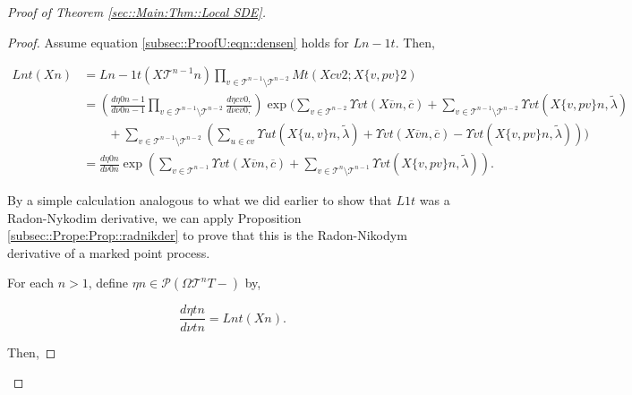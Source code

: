 \documentclass[12pt]{article}
\newcommand{\mc}{\mathcal}
\newcommand{\ov}{\overline}
\newcommand{\ind}{\hspace{24pt}}
\newcommand{\pmsr}{\mc{P}}							%
\renewcommand{\v}{v}							%
\newcommand{\vv}{u}								%
\newcommand{\T}{T}								%
\renewcommand{\t}{t}							%
\newcommand{\X}{X}								%
\newcommand{\cl}{\ov}							%
\newcommand{\IGrg}{\ov{c}}						%
\newcommand{\tree}{\mc{T}}						%
\newcommand{\sln}[1]{^{#1}}						%
\newcommand{\alt}[1]{\widetilde{#1}}			%
\newcommand{\mm}{\nu}							%
\newcommand{\mmm}{\eta}							%
\newcommand{\crate}{\alt{\lambda}}				%
\newcommand{\dense}{L}							%
\newcommand{\cdense}{M}							%
\newcommand{\ds}{\Upsilon}						%
\renewcommand{\c}{c}							%
\newcommand{\p}{p}								%
\begin{document}
\begin{proof}[Proof of Theorem \ref{sec::Main:Thm::Local SDE}]
\begin{proof}
Assume equation \eqref{subsec::ProofU:eqn::densen} holds for \(\dense{n-1}{\t}\). Then,

\begin{align*}
\dense{n}{\t}(\X{}{}{n}) &= \dense{n-1}{\t}(\X{\tree\sln{n-1}}{}{n})\prod_{\v\in\tree\sln{n-1}\setminus\tree\sln{n-2}} \cdense{}{\t}(\X{\c{\v}}{}{2};\X{\{\v,\p{\v}\}}{}{2})\\
&=\left(\frac{d\mmm{}{0}{n-1}}{d\mm{}{0}{n-1}}\prod_{\v\in\tree\sln{n-1}\setminus\tree\sln{n-2}}\frac{d\mmm{\c{\v}}{0,}{}}{d\mm{\c{\v}}{0,}{}}\right)\exp\Bigg(\sum_{\v\in\tree\sln{n-2}}\ds{\v}{\t}(\X{\cl{\v}}{}{n},\IGrg{}) + \sum_{\v\in\tree\sln{n-1}\setminus\tree\sln{n-2}} \ds{\v}{\t}(\X{\{\v,\p{\v}\}}{}{n},\crate{}{})\\
&\ind + \sum_{\v\in\tree\sln{n-1}\setminus\tree\sln{n-2}}\left(\sum_{\vv\in \c{\v}} \ds{\vv}{\t}(\X{\{\vv,\v\}}{}{n},\crate{}{}) + \ds{\v}{\t}(\X{\cl{\v}}{}{n},\IGrg{}) - \ds{\v}{\t}(\X{\{\v,\p{\v}\}}{}{n},\crate{}{})\right)\Bigg)\\
&=\frac{d\mmm{}{0}{n}}{d\mm{}{0}{n}}\exp\left(\sum_{\v\in\tree\sln{n-1}}\ds{\v}{\t}(\X{\cl{\v}}{}{n},\IGrg{}) + \sum_{\v\in\tree\sln{n}\setminus\tree\sln{n-1}} \ds{\v}{\t}(\X{\{\v,\p{\v}\}}{}{n},\crate{}{})\right).
\end{align*}

By a simple calculation analogous to what we did earlier to show that \(\dense{1}{\t}\) was a Radon-Nykodim derivative, we can apply Proposition \ref{subsec::Prope:Prop::radnikder} to prove that this is the Radon-Nikodym derivative of a marked point process. 

\ind For each \(n > 1\), define \(\mmm{}{}{n} \in \pmsr(\Omega{\tree\sln{n}}{\T-})\) by,

\[\frac{d\mmm{}{\t}{n}}{d\mm{}{\t}{n}} = \dense{n}{\t}(\X{}{}{n}).\]

Then,


\end{proof}
\end{proof}
\end{document}

